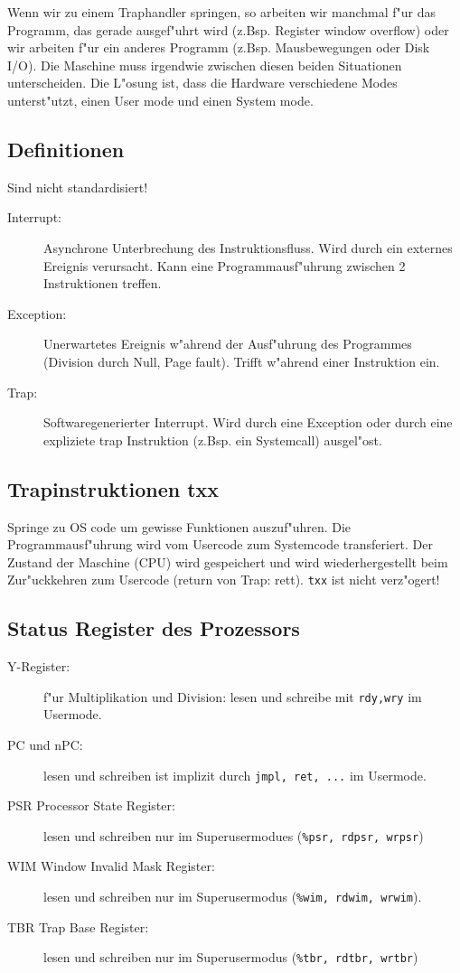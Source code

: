 \documentclass[german, 10pt, a4paper, twocolumn]{scrartcl}
\begin{document}
Wenn wir zu einem Traphandler springen, so arbeiten wir manchmal f"ur das Programm, das gerade ausgef"uhrt wird (z.Bsp. Register window overflow) oder wir arbeiten f"ur ein anderes Programm (z.Bsp. Mausbewegungen oder Disk I/O). Die Maschine muss irgendwie zwischen diesen beiden Situationen unterscheiden. Die L"osung ist, dass die Hardware verschiedene Modes unterst"utzt, einen User mode und einen System mode.

\subsection{Definitionen}

Sind nicht standardisiert!

\begin{description}
	\item[Interrupt:] Asynchrone Unterbrechung des Instruktionsfluss. Wird durch ein externes Ereignis verursacht. Kann eine Programmausf"uhrung zwischen 2 Instruktionen treffen.
	\item[Exception:] Unerwartetes Ereignis w"ahrend der Ausf"uhrung des Programmes (Division durch Null, Page fault). Trifft w"ahrend einer Instruktion ein.
	\item[Trap:] Softwaregenerierter Interrupt. Wird durch eine Exception oder durch eine expliziete trap Instruktion (z.Bsp. ein Systemcall) ausgel"ost.
\end{description}

\subsection{Trapinstruktionen txx}

Springe zu OS code um gewisse Funktionen auszuf"uhren. Die Programmausf"uhrung wird vom Usercode zum Systemcode transferiert. Der Zustand der Maschine (CPU) wird gespeichert und wird wiederhergestellt beim Zur"uckkehren zum Usercode (return von Trap: rett). \verb#txx# ist nicht verz"ogert!

\subsection{Status Register des Prozessors}

\begin{description}
	\item[Y-Register:] f"ur Multiplikation und Division: lesen und schreibe mit \verb#rdy,wry# im Usermode.
	\item[PC und nPC:] lesen und schreiben ist implizit durch \verb#jmpl, ret, ...# im Usermode.
	\item[PSR Processor State Register:] lesen und schreiben nur im Superusermodues (\verb#%psr, rdpsr, wrpsr#)
	\item[WIM Window Invalid Mask Register:] lesen und schreiben nur im Superusermodus (\verb#%wim, rdwim, wrwim#).
	\item[TBR Trap Base Register:] lesen und schreiben nur im Superusermodus (\verb#%tbr, rdtbr, wrtbr#)
\end{description}
\end{document}
